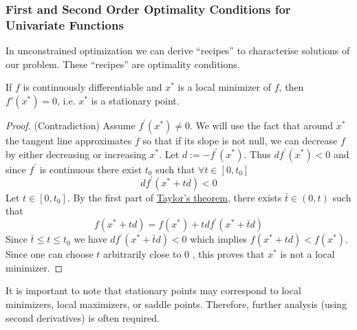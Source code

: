 \documentclass[9pt, headings=standardclasses, parskip=half]{scrartcl}
\renewcommand{\emph}[1]{\textcolor{mypurple}{#1}}
\begin{document}
\subsubsection{First and Second Order Optimality Conditions for Univariate Functions}
In unconstrained optimization we can derive ``recipes'' to characterise solutions of our problem. These ``recipes'' are optimality conditions.

\begin{theorem}\label{thm:nec_first_order_optimality_univariate}
If \(f\) is continuously differentiable and \(x^*\) is a local minimizer of \(f\), then \(f'(x^*)=0\), i.e. \(x^*\) is a \emph{stationary point}.
\end{theorem}
\begin{proof}
(Contradiction)
Assume $f^{\prime}\left(x^*\right) \neq 0$. We will use the fact that around $x^*$ the tangent line approximates $f$ so that if its slope is not null, we can decrease $f$ by either decreasing or increasing $x^*$. Let $d:=-f^{\prime}\left(x^*\right)$. Thus $d f^{\prime}\left(x^*\right)<0$ and since $f^{\prime}$ is continuous there exist $t_0$ such that $\forall t \in\left[0, t_0\right]$
$$
d f^{\prime}\left(x^*+t d\right)<0
$$
Let $t \in\left[0, t_0\right]$. By the first part of  \hyperref[thm:univariate_taylor_expansion]{Taylor's theorem}, there exists $\bar{t} \in(0, t)$ such that
$$
f\left(x^*+t d\right)=f\left(x^*\right)+t d f^{\prime}\left(x^*+\bar{t} d\right)
$$
Since $\bar{t} \leq t \leq t_0$ we have $d f^{\prime}\left(x^*+\bar{t} d\right)<0$ which implies $f\left(x^*+t d\right)<f\left(x^*\right)$. Since one can choose $t$ arbitrarily close to 0 , this proves that $x^*$ is not a local minimizer.
\end{proof}


It is important to note that stationary points may correspond to local minimizers, local maximizers, or saddle points. Therefore, further analysis (using second derivatives) is often required.
\end{document}
